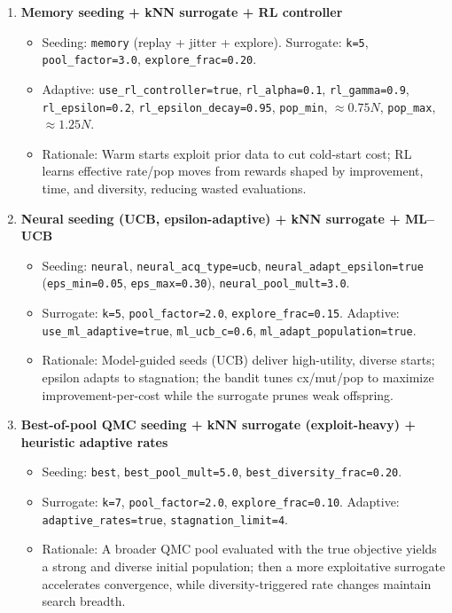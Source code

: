 \documentclass[12pt,a4paper]{article}
\begin{document}
\begin{enumerate}
\item \textbf{Memory seeding + kNN surrogate + RL controller}
\begin{itemize}
\item Seeding: \texttt{memory} (replay + jitter + explore). Surrogate: \texttt{k=5}, \texttt{pool\_factor=3.0}, \texttt{explore\_frac=0.20}.
\item Adaptive: \texttt{use\_rl\_controller=true}, \texttt{rl\_alpha=0.1}, \texttt{rl\_gamma=0.9}, \texttt{rl\_epsilon=0.2}, \texttt{rl\_epsilon\_decay=0.95}, \texttt{pop\_min}, $\approx 0.75N$, \texttt{pop\_max}, $\approx 1.25N$.
\item Rationale: Warm starts exploit prior data to cut cold-start cost; RL learns effective rate/pop moves from rewards shaped by improvement, time, and diversity, reducing wasted evaluations.
\end{itemize}

\item \textbf{Neural seeding (UCB, epsilon-adaptive) + kNN surrogate + ML–UCB}
\begin{itemize}
\item Seeding: \texttt{neural}, \texttt{neural\_acq\_type=ucb}, \texttt{neural\_adapt\_epsilon=true} (\texttt{eps\_min=0.05}, \texttt{eps\_max=0.30}), \texttt{neural\_pool\_mult=3.0}.
\item Surrogate: \texttt{k=5}, \texttt{pool\_factor=2.0}, \texttt{explore\_frac=0.15}. Adaptive: \texttt{use\_ml\_adaptive=true}, \texttt{ml\_ucb\_c=0.6}, \texttt{ml\_adapt\_population=true}.
\item Rationale: Model-guided seeds (UCB) deliver high-utility, diverse starts; epsilon adapts to stagnation; the bandit tunes cx/mut/pop to maximize improvement-per-cost while the surrogate prunes weak offspring.
\end{itemize}

\item \textbf{Best-of-pool QMC seeding + kNN surrogate (exploit-heavy) + heuristic adaptive rates}
\begin{itemize}
\item Seeding: \texttt{best}, \texttt{best\_pool\_mult=5.0}, \texttt{best\_diversity\_frac=0.20}.
\item Surrogate: \texttt{k=7}, \texttt{pool\_factor=2.0}, \texttt{explore\_frac=0.10}. Adaptive: \texttt{adaptive\_rates=true}, \texttt{stagnation\_limit=4}.
\item Rationale: A broader QMC pool evaluated with the true objective yields a strong and diverse initial population; then a more exploitative surrogate accelerates convergence, while diversity-triggered rate changes maintain search breadth.
\end{itemize}

\end{enumerate}
\end{document}
